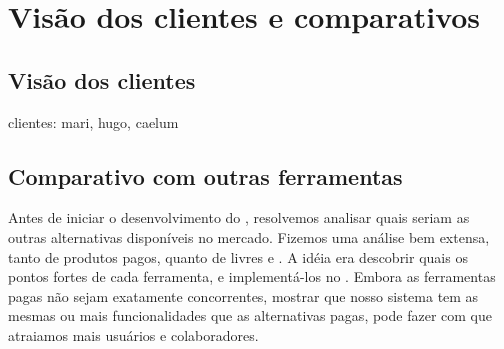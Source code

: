 \section{Visão dos clientes e comparativos}

\subsection{Visão dos clientes}
clientes: mari, hugo, caelum

\subsection{Comparativo com outras ferramentas}

Antes de iniciar o desenvolvimento do \calopsita{}, resolvemos analisar quais seriam as outras alternativas disponíveis no mercado. Fizemos uma análise bem extensa, tanto de produtos pagos, quanto de livres e \opensource{}. A idéia era descobrir quais os pontos fortes de cada ferramenta, e implementá-los no \calopsita{}. Embora as ferramentas pagas não sejam exatamente concorrentes, mostrar que nosso sistema tem as mesmas ou mais funcionalidades que as alternativas pagas, pode fazer com que atraiamos mais usuários e colaboradores.

